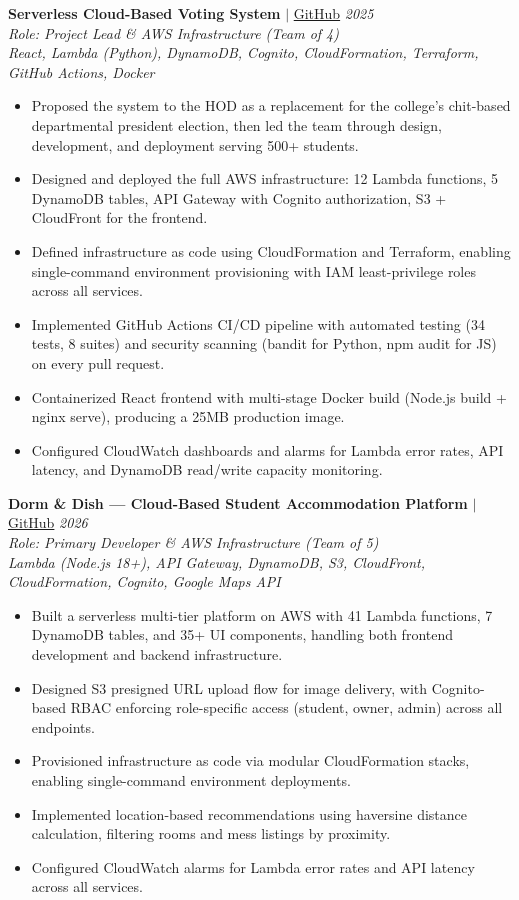 \documentclass[a4paper,10pt]{article}
\newcommand{\tech}[1]{\textit{#1}}
\begin{document}
\noindent\textbf{Serverless Cloud-Based Voting System} $|$
\href{https://github.com/prathameshlonare/Online-voting-system}{GitHub}
\hfill \textit{2025} \\
\textit{Role: Project Lead \& AWS Infrastructure (Team of 4)} \\
\tech{React, Lambda (Python), DynamoDB, Cognito, CloudFormation, Terraform, GitHub Actions, Docker}
\begin{itemize}
  \item Proposed the system to the HOD as a replacement for the college's chit-based departmental president election, then led the team through design, development, and deployment serving 500+ students.
  \item Designed and deployed the full AWS infrastructure: 12 Lambda functions, 5 DynamoDB tables, API Gateway with Cognito authorization, S3 + CloudFront for the frontend.
  \item Defined infrastructure as code using CloudFormation and Terraform, enabling single-command environment provisioning with IAM least-privilege roles across all services.
  \item Implemented GitHub Actions CI/CD pipeline with automated testing (34 tests, 8 suites) and security scanning (bandit for Python, npm audit for JS) on every pull request.
  \item Containerized React frontend with multi-stage Docker build (Node.js build + nginx serve), producing a 25MB production image.
  \item Configured CloudWatch dashboards and alarms for Lambda error rates, API latency, and DynamoDB read/write capacity monitoring.
\end{itemize}

\noindent\textbf{Dorm \& Dish --- Cloud-Based Student Accommodation Platform} $|$
\href{https://github.com/prathameshlonare/Dorm-and-Dish}{GitHub}
\hfill \textit{2026} \\
\textit{Role: Primary Developer \& AWS Infrastructure (Team of 5)} \\
\tech{Lambda (Node.js 18+), API Gateway, DynamoDB, S3, CloudFront, CloudFormation, Cognito, Google Maps API}
\begin{itemize}
  \item Built a serverless multi-tier platform on AWS with 41 Lambda functions, 7 DynamoDB tables, and 35+ UI components, handling both frontend development and backend infrastructure.
  \item Designed S3 presigned URL upload flow for image delivery, with Cognito-based RBAC enforcing role-specific access (student, owner, admin) across all endpoints.
  \item Provisioned infrastructure as code via modular CloudFormation stacks, enabling single-command environment deployments.
  \item Implemented location-based recommendations using haversine distance calculation, filtering rooms and mess listings by proximity.
  \item Configured CloudWatch alarms for Lambda error rates and API latency across all services.
\end{itemize}
\end{document}
